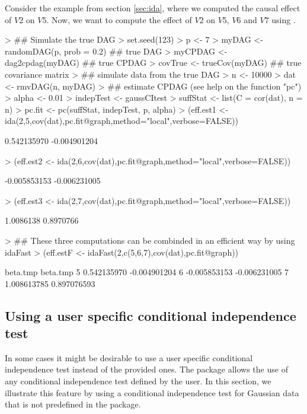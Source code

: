 \documentclass[article]{jss}
\begin{document}
Consider the example from section \ref{sec:ida}, where we computed the
causal effect of $V2$ on $V5$. Now, we want to compute the effect of
$V2$ on $V5$, $V6$ and $V7$ using .
\begin{Schunk}
\begin{Sinput}
> ## Simulate the true DAG
> set.seed(123)
> p <- 7
> myDAG <- randomDAG(p, prob = 0.2) ## true DAG
> myCPDAG <- dag2cpdag(myDAG) ## true CPDAG
> covTrue <- trueCov(myDAG) ## true covariance matrix
> ## simulate data from the true DAG
> n <- 10000
> dat <- rmvDAG(n, myDAG)
> ## estimate CPDAG (see help on the function "pc")
> alpha <- 0.01
> indepTest <- gaussCItest 
> suffStat <- list(C = cor(dat), n = n)
> pc.fit <- pc(suffStat, indepTest, p, alpha)
> (eff.est1 <- ida(2,5,cov(dat),pc.fit@graph,method="local",verbose=FALSE))
\end{Sinput}
\begin{Soutput}
[1]  0.542135970 -0.004901204
\end{Soutput}
\begin{Sinput}
> (eff.est2 <- ida(2,6,cov(dat),pc.fit@graph,method="local",verbose=FALSE))
\end{Sinput}
\begin{Soutput}
[1] -0.005853153 -0.006231005
\end{Soutput}
\begin{Sinput}
> (eff.est3 <- ida(2,7,cov(dat),pc.fit@graph,method="local",verbose=FALSE))
\end{Sinput}
\begin{Soutput}
[1] 1.0086138 0.8970766
\end{Soutput}
\begin{Sinput}
> ## These three computations can be combinded in an efficient way by using idaFast
> (eff.estF <- idaFast(2,c(5,6,7),cov(dat),pc.fit@graph))
\end{Sinput}
\begin{Soutput}
      beta.tmp     beta.tmp
5  0.542135970 -0.004901204
6 -0.005853153 -0.006231005
7  1.008613785  0.897076593
\end{Soutput}
\end{Schunk}

\subsection{Using a user specific conditional independence test} 

In some cases it might be desirable to use a user specific conditional
independence test instead of the provided ones. The 
package allows the use of any conditional independence test defined by
the user. In this section, we illustrate this feature by using a
conditional independence test for Gaussian data that is not predefined
in the package.
\end{document}

